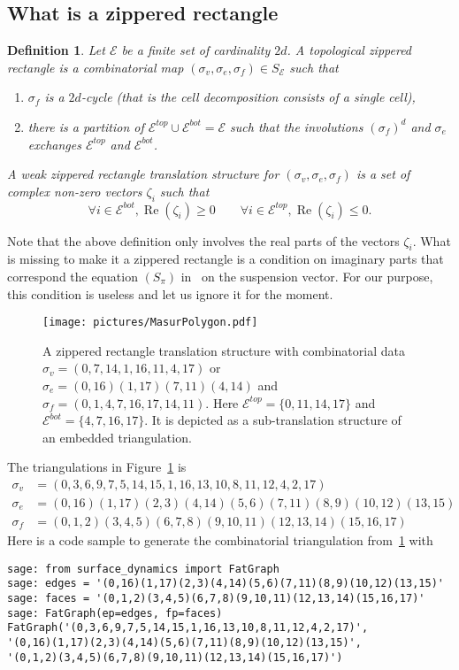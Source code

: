 \documentclass{article}
\def\cE{\mathcal{E}}
\def\Re{\operatorname{Re}}
\newtheorem{definition}{Definition}
\begin{document}
\subsection{What is a zippered rectangle}
\begin{definition}
\label{def:WeakZipperedRectangle}
Let $\cE$ be a finite set of cardinality $2d$.
A \emph{topological zippered rectangle} is a combinatorial map $(\sigma_v, \sigma_e, \sigma_f) \in S_\cE$ such that
\begin{enumerate}
\item $\sigma_f$ is a $2d$-cycle (that is the cell decomposition consists of a single cell),
\item there is a partition of $\cE^{top} \cup \cE^{bot} = \cE$ such that the 
involutions $(\sigma_f)^d$ and $\sigma_e$ exchanges $\cE^{top}$ and $\cE^{bot}$.
\end{enumerate}
A \emph{weak zippered rectangle translation structure} for $(\sigma_v, \sigma_e, \sigma_f)$ is
a set of complex non-zero vectors $\zeta_i$ such that
\[
\forall i \in \cE^{bot}, \Re(\zeta_i) \geq 0
\qquad
\forall i \in \cE^{top}, \Re(\zeta_i) \leq 0.
\]
\end{definition}
Note that the above definition only involves the real parts of the vectors $\zeta_i$.
What is missing to make it a zippered rectangle is a condition on imaginary parts
that correspond the equation $(S_\pi)$ in~\cite{Yoccoz} on the suspension vector. For
our purpose, this condition is useless and let us ignore it for the moment.
\begin{figure}[!ht]
\begin{center}\texttt{[image: pictures/MasurPolygon.pdf]}\end{center}
\caption{A zippered rectangle translation structure with combinatorial data
$\sigma_v = (0,7,14,1,16,11,4,17)$ or
$\sigma_e = (0,16)(1,17)(7,11)(4,14)$ and
$\sigma_f = (0,1,4,7,16,17,14,11)$. Here $\cE^{top} = \{0,11,14,17\}$ and $\cE^{bot} = \{4,7,16,17\}$. It is depicted as a sub-translation structure of an embedded triangulation.}
\label{fig:TriangulationYoccoz}
\end{figure}
The triangulations in Figure~\ref{fig:TriangulationYoccoz} is
\begin{align*}
\sigma_v &= (0,3,6,9,7,5,14,15,1,16,13,10,8,11,12,4,2,17) \\
\sigma_e &= (0,16)(1,17)(2,3)(4,14)(5,6)(7,11)(8,9)(10,12)(13,15) \\
\sigma_f &= (0,1,2)(3,4,5)(6,7,8)(9,10,11)(12,13,14)(15,16,17)
\end{align*}
Here is a code sample to generate the combinatorial triangulation from~\ref{fig:TriangulationYoccoz} with \cite{surface-dynamics}
\begin{verbatim}
sage: from surface_dynamics import FatGraph
sage: edges = '(0,16)(1,17)(2,3)(4,14)(5,6)(7,11)(8,9)(10,12)(13,15)'
sage: faces = '(0,1,2)(3,4,5)(6,7,8)(9,10,11)(12,13,14)(15,16,17)'
sage: FatGraph(ep=edges, fp=faces)
FatGraph('(0,3,6,9,7,5,14,15,1,16,13,10,8,11,12,4,2,17)',
'(0,16)(1,17)(2,3)(4,14)(5,6)(7,11)(8,9)(10,12)(13,15)', 
'(0,1,2)(3,4,5)(6,7,8)(9,10,11)(12,13,14)(15,16,17)')
\end{verbatim}
\end{document}
